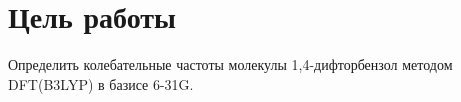 \section{Цель работы}
Определить колебательные частоты молекулы 1,4-дифторбензол методом DFT(B3LYP) в базисе 6-31G.
